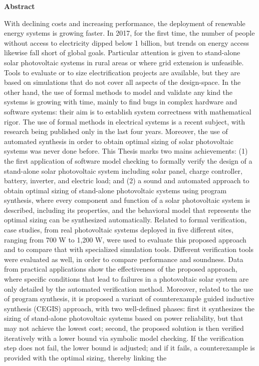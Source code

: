 \thispagestyle{plain}
\begin{center}
%    
%    
%    
    \vspace{0.9cm}
    \textbf{Abstract}
\end{center}
With declining costs and increasing performance, the deployment of renewable energy systems is growing faster. In 2017, for the first time, the number of people without access to electricity dipped below 1 billion, but trends on energy access likewise fall short of global goals. Particular attention is given to stand-alone solar photovoltaic systems in rural areas or where grid extension is unfeasible. Tools to evaluate or to size electrification projects are available, but they are based on simulations that do not cover all aspects of the design-space. In the other hand, the use of formal methods to model and validate any kind the systems is growing with time, mainly to find bugs in complex hardware and software systems: their aim is to establish system correctness with mathematical rigor. The use of formal methods in electrical systems is a recent subject, with research being published only in the last four years. Moreover, the use of automated synthesis in order to obtain optimal sizing of solar photovoltaic systems was never done before. This Thesis marks two mains achievements: (1) the first application of software model checking to formally verify the design of a stand-alone solar photovoltaic system including solar panel, charge controller, battery, inverter, and electric load; and (2) a sound and automated approach to obtain optimal sizing of stand-alone photovoltaic systems using program synthesis, where every component and function of a solar photovoltaic system is described, including its properties, and the behavioral model that represents the optimal sizing can be synthesized automatically. Related to formal verification, case studies, from real photovoltaic systems deployed in five different sites, ranging from 700 W to 1,200 W, were used to evaluate this proposed approach and to compare that with specialized simulation tools. Different verification tools were evaluated as well, in order to compare performance and soundness. Data from practical applications show the effectiveness of the proposed approach, where specific conditions that lead to failures in a photovoltaic solar system are only detailed by the automated verification method. Moreover, related to the use of program synthesis, it is proposed a variant of counterexample guided inductive synthesis (CEGIS) approach, with two well-defined phases: first it synthesizes the sizing of stand-alone photovoltaic systems based on power reliability, but that may not achieve the lowest cost; second, the proposed solution is then verified iteratively with a lower bound via symbolic model checking. If the verification step does not fail, the lower bound is adjusted; and if it fails, a counterexample is provided with the optimal sizing, thereby linking the 